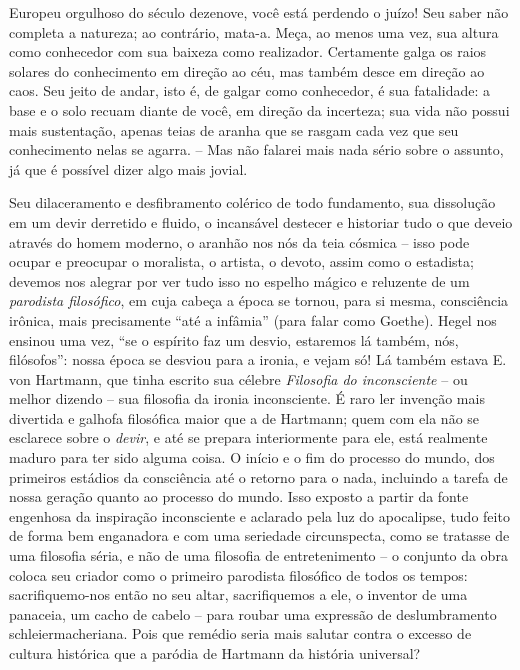 \begin{enumerate}
\begin{enumerate}
    Europeu orgulhoso do século dezenove, você está perdendo o juízo!
    Seu saber não completa a natureza; ao contrário, mata-a. Meça, ao
    menos uma vez, sua altura como conhecedor com sua baixeza como
    realizador. Certamente galga os raios solares do conhecimento em
    direção ao céu, mas também desce em direção ao caos. Seu jeito de
    andar, isto é, de galgar como conhecedor, é sua fatalidade: a base e
    o solo recuam diante de você, em direção da incerteza; sua vida não
    possui mais sustentação, apenas teias de aranha que se rasgam cada
    vez que seu conhecimento nelas se agarra. -- Mas não falarei mais
    nada sério sobre o assunto, já que é possível dizer algo mais
    jovial.

    Seu dilaceramento e desfibramento colérico de todo fundamento, sua
    dissolução em um devir derretido e fluido, o incansável destecer e
    historiar tudo o que deveio através do homem moderno, o aranhão nos
    nós da teia cósmica -- isso pode ocupar e preocupar o moralista, o
    artista, o devoto, assim como o estadista; devemos nos alegrar por
    ver tudo isso no espelho mágico e reluzente de um \emph{parodista
    filosófico}, em cuja cabeça a época se tornou, para si mesma,
    consciência irônica, mais precisamente ``até a infâmia'' (para falar
    como Goethe). Hegel nos ensinou uma vez, ``se o espírito faz um
    desvio, estaremos lá também, nós, filósofos'': nossa época se
    desviou para a ironia, e vejam só! Lá também estava E. von Hartmann,
    que tinha escrito sua célebre \emph{Filosofia do inconsciente} -- ou
    melhor dizendo -- sua filosofia da ironia inconsciente. É raro ler
    invenção mais divertida e galhofa filosófica maior que a de
    Hartmann; quem com ela não se esclarece sobre o \emph{devir}, e até
    se prepara interiormente para ele, está realmente maduro para ter
    sido alguma coisa. O início e o fim do processo do mundo, dos
    primeiros estádios da consciência até o retorno para o nada,
    incluindo a tarefa de nossa geração quanto ao processo do mundo.
    Isso exposto a partir da fonte engenhosa da inspiração inconsciente
    e aclarado pela luz do apocalipse, tudo feito de forma bem
    enganadora e com uma seriedade circunspecta, como se tratasse de uma
    filosofia séria, e não de uma filosofia de entretenimento -- o
    conjunto da obra coloca seu criador como o primeiro parodista
    filosófico de todos os tempos: sacrifiquemo-nos então no seu altar,
    sacrifiquemos a ele, o inventor de uma panaceia, um cacho de cabelo
    -- para roubar uma expressão de deslumbramento schleiermacheriana.
    Pois que remédio seria mais salutar contra o excesso de cultura
    histórica que a paródia de Hartmann da história universal?


\end{enumerate}
\end{enumerate}
